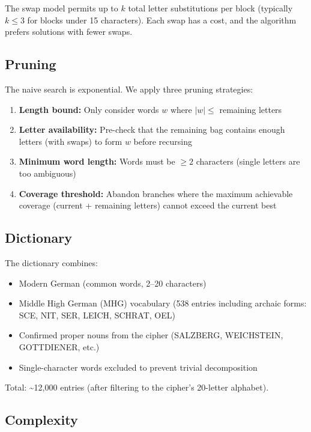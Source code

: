 \documentclass[11pt,a4paper]{article}
\begin{document}
The swap model permits up to $k$ total letter substitutions per block (typically $k \leq 3$ for blocks under 15 characters). Each swap has a cost, and the algorithm prefers solutions with fewer swaps.

\subsection{Pruning}

The naive search is exponential. We apply three pruning strategies:

\begin{enumerate}
\item \textbf{Length bound:} Only consider words $w$ where $|w| \leq$ remaining letters
\item \textbf{Letter availability:} Pre-check that the remaining bag contains enough letters (with swaps) to form $w$ before recursing
\item \textbf{Minimum word length:} Words must be $\geq 2$ characters (single letters are too ambiguous)
\item \textbf{Coverage threshold:} Abandon branches where the maximum achievable coverage (current + remaining letters) cannot exceed the current best
\end{enumerate}

\subsection{Dictionary}

The dictionary combines:

\begin{itemize}
\item Modern German (common words, 2--20 characters)
\item Middle High German (MHG) vocabulary (538 entries including archaic forms: SCE, NIT, SER, LEICH, SCHRAT, OEL)
\item Confirmed proper nouns from the cipher (SALZBERG, WEICHSTEIN, GOTTDIENER, etc.)
\item Single-character words excluded to prevent trivial decomposition
\end{itemize}

Total: \textasciitilde12,000 entries (after filtering to the cipher's 20-letter alphabet).

\subsection{Complexity}
\end{document}
